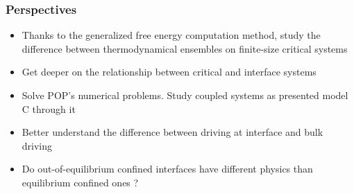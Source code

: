 \documentclass[9pt, dvipsnames]{beamer} %
\begin{document}
\begin{frame}
    \frametitle{Perspectives}
    \begin{itemize}
    	\item Thanks to the generalized free energy computation method, study the difference between thermodynamical ensembles on finite-size critical systems
    	\item Get deeper on the relationship between critical and interface systems
    	\item Solve POP's numerical problems. Study coupled systems as presented model C through it
    	\item Better understand the difference between driving at interface and bulk driving
    	\item Do out-of-equilibrium confined interfaces have different physics than equilibrium confined ones ?
    \end{itemize}
\end{frame}
\end{document}
